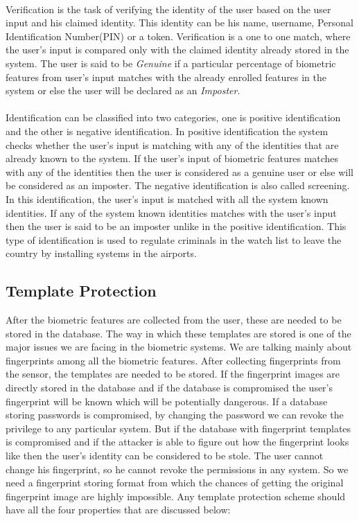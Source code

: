 \documentclass[14pt, oneside]{article}   	%
\begin{document}
\paragraph{}
Verification is the task of verifying the identity of the user based on the user input and his claimed identity. This identity can be his name, username, Personal Identification Number(PIN) or a token. Verification is a one to one match, where the user's input is compared only with the claimed identity already stored in the system.  The user is said to be \textit{Genuine} if a particular percentage of biometric features from user's input matches with the already enrolled features in the system or else the user will be declared as an \textit{Imposter}. 
\paragraph{}
Identification can be classified into two categories, one is positive identification and the other is negative identification. In positive identification the system checks whether the user's input is matching with any of the identities that are already known to the system. If the user's input of biometric features matches with any of the identities then the user is considered as a genuine user or else will be considered as an imposter.  The negative identification is also called screening. In this identification, the user's input is matched with all the system known identities. If any of the system known identities matches with the user's input then the user is  said to be an imposter unlike in the positive identification. This type of identification is used to regulate criminals in the watch list to leave the country by installing systems in the airports. \cite{1}
\subsection{Template Protection}
After the biometric features are collected from the user, these are needed to be stored in the database. The way in which these templates are stored is one of the major issues we are facing in the biometric systems. We are talking mainly about fingerprints among all the biometric features. After collecting fingerprints from the sensor, the templates are needed to be stored. If the fingerprint images are directly stored in the database and if the database is compromised the user's fingerprint will be known which will be potentially dangerous. If a database storing passwords is compromised, by changing the password we can revoke the privilege to any particular system. But if the database with fingerprint templates is compromised and if the attacker is able to figure out how the fingerprint looks like then the user's identity can be considered to be stole. The user cannot change his fingerprint, so he cannot revoke the permissions in any system. So we need a fingerprint storing format from which the chances of getting the original fingerprint image are highly impossible. Any template protection scheme should have all the four properties that are discussed below:\cite{2}
\end{document}
